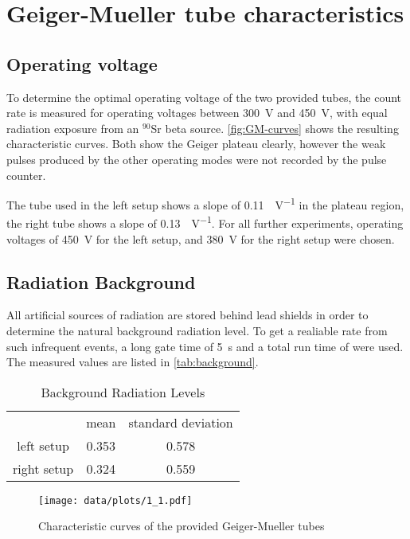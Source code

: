 \chapter{Geiger-Mueller tube characteristics}
\section{Operating voltage}
To determine the optimal operating voltage of the two provided tubes, the count rate is measured for operating voltages between \SI{300}{\volt} and \SI{450}{\volt}, with equal radiation exposure from an $^{90}$Sr beta source.
\autoref{fig:GM-curves} shows the resulting characteristic curves.
Both show the Geiger plateau clearly, however the weak pulses produced by the other operating modes were not recorded by the pulse counter.

The tube used in the left setup shows a slope of \SI{0.11}{\cps\per\volt} in the plateau region, the right tube shows a slope of \SI{0.13}{\cps\per\volt}.
For all further experiments, operating voltages of \SI{450}{\volt} for the left setup, and \SI{380}{\volt} for the right setup were chosen.

\section{Radiation Background}
All artificial sources of radiation are stored behind lead shields in order to determine the natural background radiation level.
To get a realiable rate from such infrequent events, a long gate time of \SI{5}{\second} and a total run time of  were used.
The measured values are listed in \autoref{tab:background}.

\begin{table}[b!]\centering
	\caption{Background Radiation Levels}
	\label{tab:background}
	\begin{tabular}{ccc}
		&	mean& standard deviation\\
		left setup&	\SI{0.353}{\cps}&	\SI{0.578}{\cps}\\
		right setup&	\SI{0.324}{\cps}&	\SI{0.559}{\cps}\\
	\end{tabular}
\end{table}

\begin{figure}[b!]
	\centering
	\texttt{[image: data/plots/1\_1.pdf]}
	\caption{Characteristic curves of the provided Geiger-Mueller tubes}
	\label{fig:GM-curves}
\end{figure}

